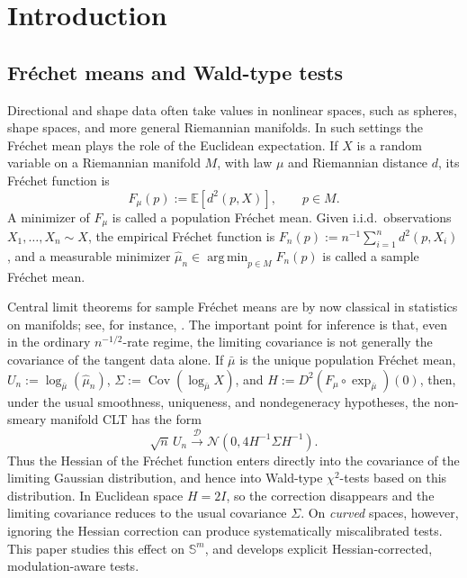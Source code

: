 \documentclass{amsart}
\theoremstyle{definition}
\theoremstyle{remark}
\newcommand{\mubar}{\bar{\mu}}
\newcommand\0{\boldsymbol{0}}
\begin{document}

\section{Introduction}\label{scn:introduction}

\subsection{Fr\'echet means and Wald-type tests}
\label{subsec:intro-frechet-wald}

Directional and shape data often take values in nonlinear spaces, such as spheres, shape spaces, and more general Riemannian manifolds.  In such settings the Fr\'echet mean plays the role of the Euclidean expectation.  If \(X\) is a random variable on a Riemannian manifold \(M\), with law \(\mu\) and Riemannian distance \(d\), its Fr\'echet function is
\[
F_\mu(p):=\mathbb E[d^2(p,X)],\qquad p\in M.
\]
A minimizer of \(F_\mu\) is called a population Fr\'echet mean.  Given i.i.d.\ observations \(X_1,\dots,X_n\sim X\), the empirical Fr\'echet function is \(F_n(p):=n^{-1}\sum_{i=1}^n d^2(p,X_i)\), and a measurable minimizer \(\hat\mu_n\in\operatorname*{arg\,min}_{p\in M}F_n(p)\) is called a sample Fr\'echet mean.

Central limit theorems for sample Fr\'echet means are by now classical in statistics on manifolds; see, for instance, \citet{HendriksLandsman1998,BP2,BL,HH,H_Procrustes_10}.  The important point for inference is that, even in the ordinary \(n^{-1/2}\)-rate regime, the limiting covariance is not generally the covariance of the tangent data alone.  If \(\mubar\) is the unique population Fr\'echet mean, \(U_n:=\log_{\mubar}(\hat\mu_n)\), \(\Sigma:=\operatorname{Cov}(\log_{\mubar}X)\), and \(H:=D^2(F_\mu\circ\exp_{\mubar})(0)\), then, under the usual smoothness, uniqueness, and nondegeneracy hypotheses, the non-smeary manifold CLT has the form
\[
\sqrt n\,U_n\xrightarrow{\mathcal D}
\mathcal N(0,4H^{-1}\Sigma H^{-1}).
\]
Thus the Hessian of the Fr\'echet function enters directly into the covariance of the limiting Gaussian distribution, and hence into Wald-type \(\chi^2\)-tests based on this distribution. In Euclidean space \(H=2I\), so the correction disappears and the limiting covariance reduces to the usual covariance \(\Sigma\). On \textit{curved }spaces, however, ignoring the Hessian correction can produce systematically miscalibrated tests.  This paper studies this effect on \(\mathbb S^m\), and develops explicit Hessian-corrected, modulation-aware tests.
\end{document}
